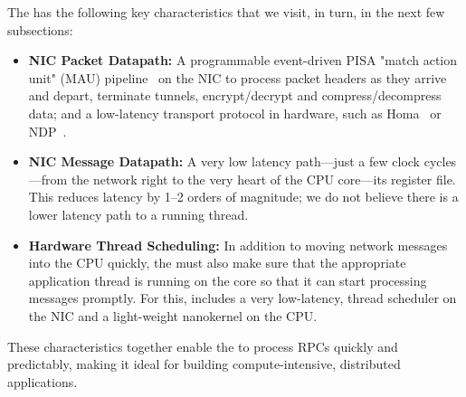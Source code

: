 The \name{} has the following key characteristics that we visit, in turn, in the next few subsections: 
\begin{itemize}[topsep=0.4\baselineskip, leftmargin=20pt]
    \item {\bf NIC Packet Datapath:} A programmable event-driven PISA "match action unit" (MAU) pipeline~\cite{event-driven-pisa} on the NIC to process packet headers as they arrive and depart, terminate tunnels, encrypt/decrypt and compress/decompress data; and a low-latency transport protocol in hardware, such as Homa~\cite{homa} or NDP~\cite{ndp}.
    
    \item {\bf NIC Message Datapath:} A very low latency path---just a few clock cycles---from the network right to the very heart of the CPU core---its register file. 
    This reduces latency by 1--2 orders of magnitude; we do not believe there is a lower latency path to a running thread.
    
    \item {\bf Hardware Thread Scheduling:} In addition to moving network messages into the CPU quickly, the \name{} must also make sure that the appropriate application thread is running on the core so that it can start processing messages promptly. For this, \name{} includes a very low-latency, thread scheduler on the NIC and a light-weight nanokernel on the CPU.
\end{itemize}

These characteristics together enable the \name{} to process RPCs quickly and predictably, making it ideal for building compute-intensive, distributed applications.





